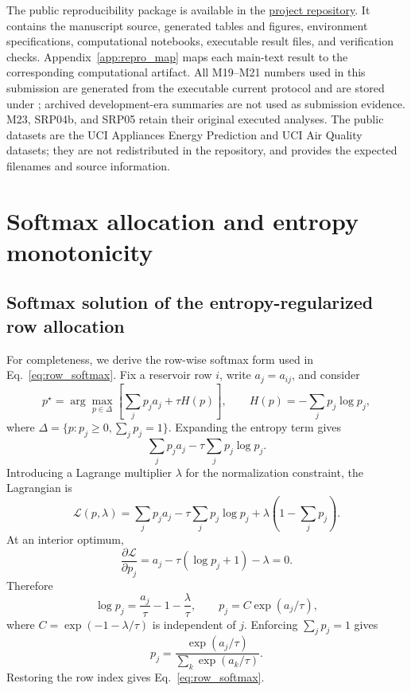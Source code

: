 \documentclass[11pt,a4paper]{article}
\begin{document}
The public reproducibility package is available in the \href{https://github.com/ildefons/temperature-calibrated-reservoirs}{project repository}. It contains the manuscript source, generated tables and figures, environment specifications, computational notebooks, executable result files, and verification checks. Appendix~\ref{app:repro_map} maps each main-text result to the corresponding computational artifact. All M19--M21 numbers used in this submission are generated from the executable current protocol and are stored under ; archived development-era summaries are not used as submission evidence. M23, SRP04b, and SRP05 retain their original executed analyses. The public datasets are the UCI Appliances Energy Prediction and UCI Air Quality datasets; they are not redistributed in the repository, and  provides the expected filenames and source information.

\appendix
\section{Softmax allocation and entropy monotonicity}
\label{app:derivations}

\subsection{Softmax solution of the entropy-regularized row allocation}

For completeness, we derive the row-wise softmax form used in Eq.~\eqref{eq:row_softmax}. Fix a reservoir row $i$, write $a_j=a_{ij}$, and consider
\begin{equation}
  p^\star=\arg\max_{p\in\Delta}
  \left[\sum_j p_j a_j+\tau H(p)\right],
  \qquad
  H(p)=-\sum_j p_j\log p_j,
\end{equation}
where $\Delta=\{p:p_j\ge 0,\sum_jp_j=1\}$. Expanding the entropy term gives
\begin{equation}
  \sum_j p_j a_j-\tau\sum_j p_j\log p_j.
\end{equation}
Introducing a Lagrange multiplier $\lambda$ for the normalization constraint, the Lagrangian is
\begin{equation}
  \mathcal L(p,\lambda)=
  \sum_j p_j a_j-
  \tau\sum_jp_j\log p_j+
  \lambda\left(1-\sum_jp_j\right).
\end{equation}
At an interior optimum,
\begin{equation}
  \frac{\partial\mathcal L}{\partial p_j}
  =a_j-\tau(\log p_j+1)-\lambda=0.
\end{equation}
Therefore
\begin{equation}
  \log p_j=\frac{a_j}{\tau}-1-\frac{\lambda}{\tau},
  \qquad
  p_j=C\exp(a_j/\tau),
\end{equation}
where $C=\exp(-1-\lambda/\tau)$ is independent of $j$. Enforcing $\sum_jp_j=1$ gives
\begin{equation}
  p_j=\frac{\exp(a_j/\tau)}{\sum_k\exp(a_k/\tau)}.
\end{equation}
Restoring the row index gives Eq.~\eqref{eq:row_softmax}.
\end{document}
